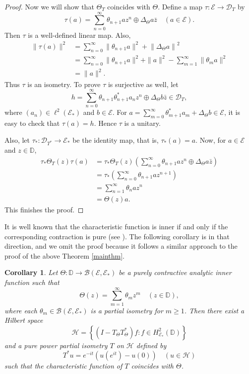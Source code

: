 \documentclass[12pt]{amsart}
\newcommand{\clb}{\mathcal{B}}
\newcommand{\cld}{\mathcal{D}}
\newcommand{\cle}{\mathcal{E}}
\newcommand{\clh}{\mathcal{H}}
\newcommand{\D}{\mathbb{D}}
\newcommand{\E}{\mathcal{E}}
\theoremstyle{definition}
\theoremstyle{plain}
\newtheorem{cor}[thm]{Corollary}
\theoremstyle{definition}
\numberwithin{equation}{section}
\begin{document}
\begin{proof}
Now we will show that $\Theta_T$ coincides with $\Theta$. Define a map $\tau: \E \rightarrow \mathcal{D}_T$  by 
\[
\tau(a)=\sum\limits_{n=0}^\infty \theta_{n+1}az^n\oplus\Delta_{\Theta}a\bar{z} \quad (a \in \cle).
\]
Then $\tau$ is a well-defined linear map. Also,
\begin{align*}
\|\tau(a)\|^2&=\sum\limits_{n=0}^\infty\|\theta_{n+1}a\|^2+\left\| \Delta_{\Theta}a\right\|^2\\
&=\sum\limits_{n=0}^\infty\|\theta_{n+1}a\|^2+ \|a\|^2- \sum\limits_{m=1}^\infty \|\theta_ma\|^2\\
&=\|a\|^2.
\end{align*}
Thus $\tau$ is an isometry. To prove $\tau$ is surjective as well,
let 
\[
h=\sum\limits_{n=0}^\infty \theta_{n+1}\theta^*_{n+1}a_nz^n \oplus\Delta_{\Theta}b\bar{z}  \in \cld_T,
\] 
where $(a_n) \in \ell^2(\E_*)$ and $b \in \cle.$ For $a= \sum\limits_{m=0}^\infty\theta^*_{m+1}a_m+\Delta_{\Theta}b \in \cle$, it is easy to check that 
$\tau(a)=h$. Hence $\tau$ is a unitary.

Also, let $\tau_*: \cld_{T^*} \rightarrow \cle_*$ be the identity map, that is, 
$\tau_*(a) = a$. Now, for $ a \in \cle$ and $z \in \D$,
\begin{align*}
\tau_*\Theta_T( z)\tau(a)&= \tau_*\Theta_T( z)\left(\sum\limits_{n=0}^\infty \theta_{n+1}az^n \oplus\Delta_{\Theta}a\bar{z}\right)\\
&=\tau_*\left(\sum\limits_{n=0}^\infty \theta_{n+1}a z^{n+1}\right)\\
&=\sum\limits_{n=1}^\infty \theta_{n}a z^{n}\\
&=\Theta( z)a.
\end{align*}
This finishes the proof.
\end{proof}



It is well known that the characteristic function is inner if and only if the corresponding contraction is pure (see \cite{sznagy}). The following corollary is in that direction, and we omit the proof because it follows a similar approach to the proof of the above Theorem \ref{mainthm}.


\begin{cor}
Let $\Theta: \D \rightarrow \clb(\cle,\cle_*)$ be a purely contractive analytic inner function such that 
\[
\Theta( z)=\sum\limits_{m=1}^\infty  \theta_mz^m \quad (z\in \D),
\]
where each $\theta_m \in \clb(\cle,\cle_*)$ is a partial isometry for $m \geq 1$. Then there exist a Hilbert space  
\[
\clh=\left\{(I-T_\Theta T_\Theta^*)f: f \in H^2_{\E_*}(\D) \right\}
\]
and a pure power partial isometry $T$ on $\clh$ defined by
\[
T^*u = e^{-it}\left(u(e^{it}) - u(0)\right)  \quad (u \in \clh)
\]
such that the characteristic function of $T$ coincides with $\Theta$.
\end{cor}
\end{document}
